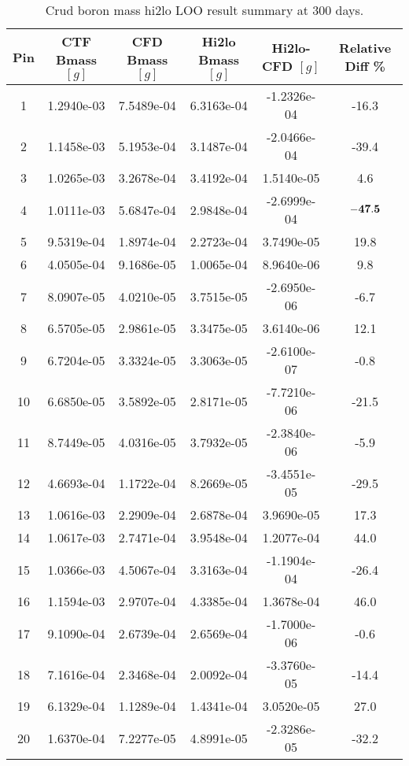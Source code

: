 \begin{table}[h]
    \begin{center}
    \caption[Hi2lo crud boron mass results]{Crud boron mass hi2lo LOO result summary at 300 days.}
    \begin{tabular}[h]{|c|c|c|c|c|c|}
        \hline
        Pin & CTF Bmass $[g]$ & CFD Bmass $[g]$ & Hi2lo Bmass $[g]$ & Hi2lo-CFD $[g]$ & Relative Diff \% \\
\hline
1  & 1.2940e-03 & 7.5489e-04 & 6.3163e-04 & -1.2326e-04 &  -16.3 \\
2  & 1.1458e-03 & 5.1953e-04 & 3.1487e-04 & -2.0466e-04 &  -39.4 \\
3  & 1.0265e-03 & 3.2678e-04 & 3.4192e-04 & 1.5140e-05 &  4.6 \\ 
4  & 1.0111e-03 & 5.6847e-04 & 2.9848e-04 & -2.6999e-04 &  $\bf{-47.5}$ \\
5  & 9.5319e-04 & 1.8974e-04 & 2.2723e-04 & 3.7490e-05 &  19.8 \\ 
6  & 4.0505e-04 & 9.1686e-05 & 1.0065e-04 & 8.9640e-06 &  9.8 \\ 
7  & 8.0907e-05 & 4.0210e-05 & 3.7515e-05 & -2.6950e-06 &  -6.7 \\
8  & 6.5705e-05 & 2.9861e-05 & 3.3475e-05 & 3.6140e-06 &  12.1 \\ 
9  & 6.7204e-05 & 3.3324e-05 & 3.3063e-05 & -2.6100e-07 &  -0.8 \\
10  &6.6850e-05 & 3.5892e-05 & 2.8171e-05 & -7.7210e-06 &  -21.5 \\
11  &8.7449e-05 & 4.0316e-05 & 3.7932e-05 & -2.3840e-06 &  -5.9 \\
12  &4.6693e-04 & 1.1722e-04 & 8.2669e-05 & -3.4551e-05 &  -29.5 \\
13  &1.0616e-03 & 2.2909e-04 & 2.6878e-04 & 3.9690e-05 &  17.3 \\ 
14  &1.0617e-03 & 2.7471e-04 & 3.9548e-04 & 1.2077e-04 &  44.0 \\ 
15  &1.0366e-03 & 4.5067e-04 & 3.3163e-04 & -1.1904e-04 &  -26.4 \\
16  &1.1594e-03 & 2.9707e-04 & 4.3385e-04 & 1.3678e-04 &  46.0 \\ 
17  &9.1090e-04 & 2.6739e-04 & 2.6569e-04 & -1.7000e-06 &  -0.6 \\
18  &7.1616e-04 & 2.3468e-04 & 2.0092e-04 & -3.3760e-05 &  -14.4 \\
19  &6.1329e-04 & 1.1289e-04 & 1.4341e-04 & 3.0520e-05 &  27.0 \\ 
20  &1.6370e-04 & 7.2277e-05 & 4.8991e-05 & -2.3286e-05 &  -32.2 \\

\end{tabular}
\end{center}
\end{table}

